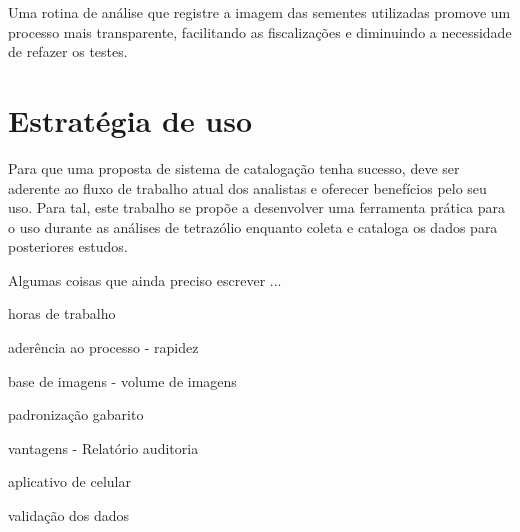 Uma rotina de análise que registre a imagem das sementes utilizadas promove um processo mais transparente, facilitando as fiscalizações e diminuindo a necessidade de refazer os testes.


\section{Estratégia de uso} 

Para que uma proposta de sistema de catalogação tenha sucesso, deve ser aderente ao fluxo de trabalho atual dos analistas e oferecer benefícios pelo seu uso. Para tal, este trabalho se propõe a desenvolver uma ferramenta prática para o uso durante as análises de tetrazólio enquanto coleta e cataloga os dados para posteriores estudos. 


Algumas coisas que ainda preciso escrever ...

horas de trabalho

aderência ao processo - rapidez

base de imagens - volume de imagens

padronização
gabarito

vantagens - Relatório
auditoria

aplicativo de celular

validação dos dados




